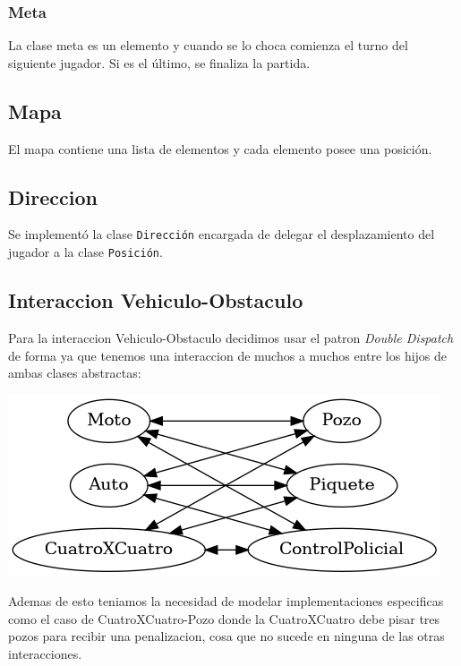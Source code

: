 \documentclass[titlepage,a4paper]{article}
\begin{document}
\subsubsection{Meta}
\label{sec:org2b9e8c8}
La clase meta es un elemento y cuando se lo choca comienza el turno
del siguiente jugador. Si es el último, se finaliza la partida.

\subsection{Mapa}
\label{sec:orga5e33b8}

El mapa contiene una lista de elementos y cada elemento posee una posición.

\subsection{Direccion}
\label{sec:org806e3d8}
Se implementó la clase \texttt{Dirección} encargada de delegar el
desplazamiento del jugador a la clase \texttt{Posición}.

\subsection{Interaccion Vehiculo-Obstaculo}
\label{sec:orgaacf678}

Para la interaccion Vehiculo-Obstaculo decidimos usar el patron \emph{Double
Dispatch} de forma ya que tenemos una interaccion de muchos a muchos entre los
hijos de ambas clases abstractas:

\begin{center}
\includegraphics[width=.9\linewidth]{diagramas/interaccionVehiculoObstaculo.png}
\end{center}

Ademas de esto teniamos la necesidad de modelar implementaciones especificas
como el caso de CuatroXCuatro-Pozo donde la CuatroXCuatro debe pisar tres pozos
para recibir una penalizacion, cosa que no sucede en ninguna de las otras interacciones.
\end{document}
